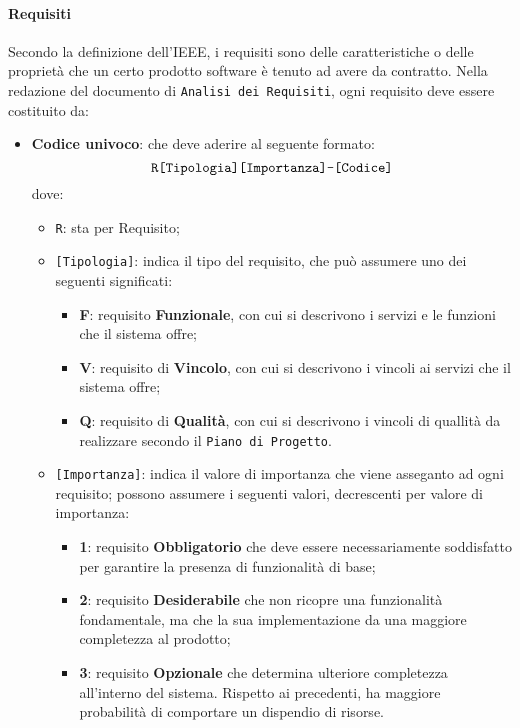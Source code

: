     \paragraph{Requisiti}
    Secondo la definizione dell'IEEE, i requisiti sono delle caratteristiche o delle proprietà che un certo prodotto software è tenuto ad avere da contratto.
    Nella redazione del documento di \texttt{Analisi dei Requisiti}, ogni requisito deve essere costituito da:
    \begin{itemize}
        \item \textbf{Codice univoco}: che deve aderire al seguente formato:
        $$\text{\texttt{R[Tipologia][Importanza]-[Codice]}}$$
        dove:
        \begin{itemize}
            \item \texttt{R}: sta per Requisito;
            \item \texttt{[Tipologia]}: indica il tipo del requisito, che può assumere uno dei seguenti significati:
                \begin{itemize}
                    \item \textbf{F}: requisito \textbf{Funzionale}, con cui si descrivono i servizi e le funzioni che il sistema offre;
                    \item \textbf{V}: requisito di \textbf{Vincolo}, con cui si descrivono i vincoli ai servizi che il sistema offre;
                    \item \textbf{Q}: requisito di \textbf{Qualità}, con cui si descrivono i vincoli di quallità da realizzare secondo il \texttt{Piano di Progetto}.
                \end{itemize}
            \item \texttt{[Importanza]}: indica il valore di importanza che viene asseganto ad ogni requisito; possono assumere i seguenti valori, decrescenti per valore di importanza:
                \begin{itemize}
                    \item \textbf{1}: requisito \textbf{Obbligatorio} che deve essere necessariamente soddisfatto per garantire la presenza di funzionalità di base;
                    \item \textbf{2}: requisito \textbf{Desiderabile} che non ricopre una funzionalità fondamentale, ma che la sua implementazione da una maggiore completezza al prodotto;
                    \item \textbf{3}: requisito \textbf{Opzionale} che determina ulteriore completezza all'interno del sistema. Rispetto ai precedenti, ha maggiore probabilità di comportare un dispendio di risorse.

\end{itemize}
\end{itemize}
\end{itemize}
